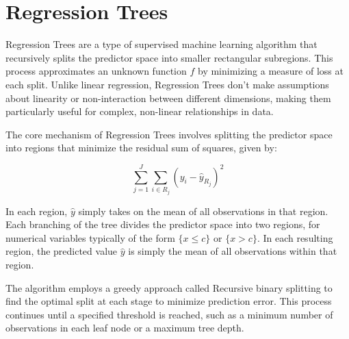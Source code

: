 \documentclass[12pt]{article}
\begin{document}
\section{Regression Trees}

Regression Trees are a type of supervised machine learning algorithm that recursively splits the predictor space into smaller rectangular subregions. This process approximates an unknown function $f$ by minimizing a measure of loss at each split. Unlike linear regression, Regression Trees don't make assumptions about linearity or non-interaction between different dimensions, making them particularly useful for complex, non-linear relationships in data.

The core mechanism of Regression Trees involves splitting the predictor space into regions that minimize the residual sum of squares, given by:

\begin{equation}
    \sum_{j=1}^{J} \sum_{i \in R_j} ( y_i- \hat{ y}_{R_j} )^2
\end{equation}



In each region, $\hat{y}$ simply takes on the mean of all observations in that region.
Each branching of the tree divides the predictor space into two regions, for numerical variables typically of the form $\{x \le c\}$ or $\{x > c\}$. In each resulting region, the predicted value $\hat{y}$ is simply the mean of all observations within that region.

The algorithm employs a greedy approach called Recursive binary splitting to find the optimal split at each stage to minimize prediction error. This process continues until a specified threshold is reached, such as a minimum number of observations in each leaf node or a maximum tree depth.
\end{document}
